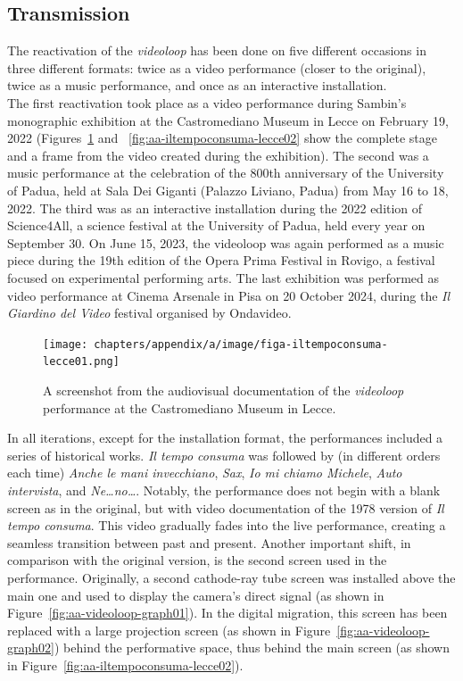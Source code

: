 \subsection*{Transmission}
The reactivation of the \textit{videoloop} has been done on five different occasions in three different formats: twice as a video performance (closer to the original), twice as a music performance, and once as an interactive installation.\\
The first reactivation took place as a video performance during Sambin's monographic exhibition at the Castromediano Museum in Lecce on February 19, 2022 (Figures~\ref{fig:aa-iltempoconsuma-lecce01} and ~\ref{fig:aa-iltempoconsuma-lecce02} show the complete stage and a frame from the video created during the exhibition). The second was a music performance at the celebration of the 800th anniversary of the University of Padua, held at Sala Dei Giganti (Palazzo Liviano, Padua) from May 16 to 18, 2022. The third was as an interactive installation during the 2022 edition of Science4All, a science festival at the University of Padua, held every year on September 30. On June 15, 2023, the videoloop was again performed as a music piece during the 19th edition of the Opera Prima Festival in Rovigo, a festival focused on experimental performing arts. The last exhibition was performed as video performance at Cinema Arsenale in Pisa on 20 October 2024, during the \textit{Il Giardino del Video} festival organised by Ondavideo.
\begin{figure}[!h]
    \centering
    \texttt{[image: chapters/appendix/a/image/figa-iltempoconsuma-lecce01.png]}
    \caption{A screenshot from the audiovisual documentation of the \textit{videoloop} performance at the Castromediano Museum in Lecce.}
    \label{fig:aa-iltempoconsuma-lecce01}
\end{figure}
In all iterations, except for the installation format, the performances included a series of historical works. \textit{Il tempo consuma} was followed by (in different orders each time) \textit{Anche le mani invecchiano}, \textit{Sax}, \textit{Io mi chiamo Michele}, \textit{Auto intervista}, and \textit{Ne…no…}. Notably, the performance does not begin with a blank screen as in the original, but with video documentation of the 1978 version of \textit{Il tempo consuma}. This video gradually fades into the live performance, creating a seamless transition between past and present. Another important shift, in comparison with the original version, is the second screen used in the performance. Originally, a second cathode-ray tube screen was installed above the main one and used to display the camera's direct signal (as shown in Figure~\ref{fig:aa-videoloop-graph01}). In the digital migration, this screen has been replaced with a large projection screen (as shown in Figure~\ref{fig:aa-videoloop-graph02}) behind the performative space, thus behind the main screen (as shown in Figure~\ref{fig:aa-iltempoconsuma-lecce02}).
